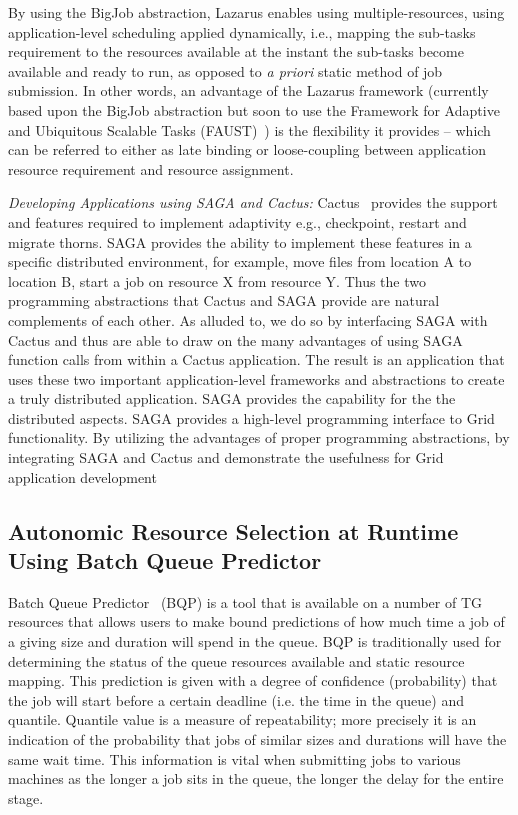 \documentclass{sig-alternate}
\newcommand{\up}{\vspace*{-0.3em}}
\begin{document}
By using the BigJob abstraction, Lazarus enables using multiple-resources, using application-level scheduling applied dynamically, i.e., mapping the sub-tasks requirement to the resources available at the instant the sub-tasks become available and ready to run, as opposed to {\it a priori} static method of job submission.  In other words, an advantage of the Lazarus framework (currently based upon the BigJob abstraction but soon to use the Framework for Adaptive and Ubiquitous Scalable Tasks (FAUST)~\cite{faust_url}) is the flexibility it provides -- which can be referred to either as late binding or loose-coupling between application resource requirement and resource assignment.

{\it Developing Applications using SAGA and Cactus:} Cactus~\cite{cactus_web} provides the support and features required to implement adaptivity e.g., checkpoint, restart and migrate thorns. SAGA provides the ability to implement these features in a specific distributed environment, for example, move files from location A to location B, start a job on resource X from resource Y.  Thus the two programming abstractions that Cactus and SAGA provide are natural complements of each other.  As alluded to, we do so by interfacing SAGA with Cactus and thus are able to draw on the many advantages of using SAGA function calls from within a Cactus application.  The result is an application that uses these two important application-level frameworks and abstractions to create a truly distributed application.  SAGA provides the capability for the the distributed aspects. SAGA provides a high-level programming interface to Grid functionality. By utilizing the advantages of proper programming abstractions, by integrating SAGA and Cactus and demonstrate the usefulness for Grid application development

\up\up
\subsection{Autonomic Resource Selection at Runtime Using Batch Queue
  Predictor}
Batch Queue Predictor~\cite{bqp, bqp_url} (BQP) is a tool that is
available on a number of TG resources that allows users to make
bound predictions of how much time a job of a giving size and duration
will spend in the queue.  BQP is traditionally used for determining
the status of the queue resources available and static resource
mapping. This prediction is given with a degree of confidence
(probability) that the job will start before a certain deadline
(i.e. the time in the queue) and quantile. Quantile value is a measure
of repeatability; more precisely it is an indication of the
probability that jobs of similar sizes and durations will have the
same wait time. This information is vital when submitting jobs to
various machines as the longer a job sits in the queue, the longer the
delay for the entire stage.
\end{document}
